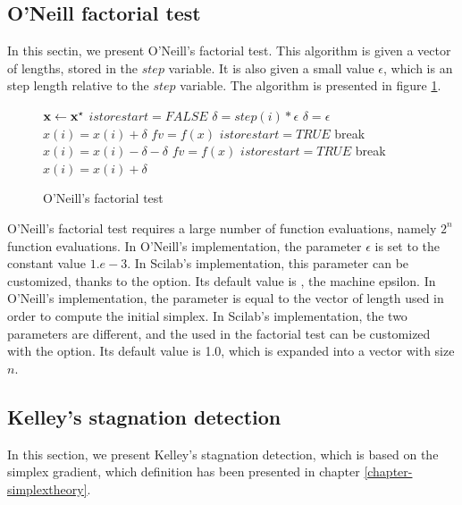 \subsection{O'Neill factorial test}

In this sectin, we present O'Neill's factorial test.
This algorithm is given a vector of lengths, stored in the 
$step$ variable. It is also given a small value $\epsilon$, which 
is an step length relative to the $step$ variable.
The algorithm is presented in figure \ref{algo-factorialtest}.

\begin{figure}[htbp]
\begin{algorithmic}
\STATE $\mathbf{x} \gets \mathbf{x}^\star$
\STATE $istorestart = FALSE$
  \STATE $\delta = step ( i ) * \epsilon$
    \STATE $\delta = \epsilon$
  \ENDIF
  \STATE $x ( i ) = x ( i ) + \delta$
  \STATE $fv = f ( x ) $
    \STATE $istorestart = TRUE$
    \STATE    break
  \ENDIF
  \STATE $x ( i ) = x ( i ) - \delta - \delta $
  \STATE $fv = f ( x ) $
    \STATE $istorestart = TRUE$
    \STATE    break
  \ENDIF
  \STATE $x ( i ) = x ( i ) + \delta$
\ENDFOR
\end{algorithmic}
\caption{O'Neill's factorial test}
\label{algo-factorialtest}
\end{figure}

O'Neill's factorial test requires a large number of function evaluations, namely 
$2^n$ function evaluations. In O'Neill's implementation, the parameter
$\epsilon$ is set to the constant value $1.e-3$.
In Scilab's implementation, this parameter can be customized, 
thanks to the  option. Its default value is ,
the machine epsilon. In O'Neill's implementation, the parameter 
is equal to the vector of length used in order to compute the initial 
simplex. In Scilab's implementation, the two parameters are different,
and the  used in the factorial test can be customized 
with the  option. Its default value is 1.0, which is 
expanded into a vector with size $n$.

\subsection{Kelley's stagnation detection}

In this section, we present Kelley's stagnation detection,
which is based on the simplex gradient, which definition has been 
presented in chapter \ref{chapter-simplextheory}.

